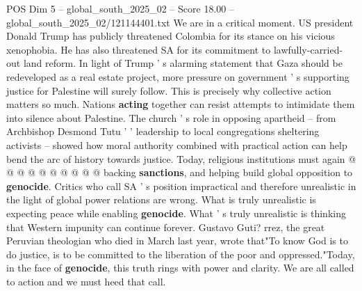 \begin{textsample}{POS Dim 5 – global\_south\_2025\_02 – Score 18.00 – global\_south\_2025\_02/121144401.txt}
We are in a critical moment.
US president Donald Trump has publicly threatened Colombia for its stance on his vicious xenophobia.
He has also threatened SA for its commitment to lawfully-carried-out land reform.
In light of Trump ' s alarming statement that Gaza should be redeveloped as a real estate project, more pressure on government ' s supporting justice for Palestine will surely follow.
This is precisely why collective action matters so much.
Nations \textbf{acting} together can resist attempts to intimidate them into silence about Palestine.
The church ' s role in opposing apartheid -- from Archbishop Desmond Tutu ' ' leadership to local congregations sheltering activists -- showed how moral authority combined with practical action can help bend the arc of history towards justice.
Today, religious institutions must again @ @ @ @ @ @ @ @ @ @ backing \textbf{sanctions}, and helping build global opposition to \textbf{genocide}.
Critics who call SA ' s position impractical and therefore unrealistic in the light of global power relations are wrong.
What is truly unrealistic is expecting peace while enabling \textbf{genocide}.
What ' s truly unrealistic is thinking that Western impunity can continue forever.
Gustavo Guti? rrez, the great Peruvian theologian who died in March last year, wrote that"To know God is to do justice, is to be committed to the liberation of the poor and oppressed."Today, in the face of \textbf{genocide}, this truth rings with power and clarity.
We are all called to action and we must heed that call.

\end{textsample}
